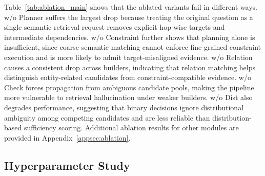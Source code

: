 \documentclass{article}
\theoremstyle{plain}
\theoremstyle{definition}
\theoremstyle{remark}
\begin{document}
Table~\ref{tab:ablation_main} shows that the ablated variants fail in different ways. 
w/o Planner suffers the largest drop because treating the original question as a single semantic retrieval request removes explicit hop-wise targets and intermediate dependencies. 
w/o Constraint further shows that planning alone is insufficient, since coarse semantic matching cannot enforce fine-grained constraint execution and is more likely to admit target-misaligned evidence. 
w/o Relation causes a consistent drop across builders, indicating that relation matching helps distinguish entity-related candidates from constraint-compatible evidence. 
w/o Check forces propagation from ambiguous candidate pools, making the pipeline more vulnerable to retrieval hallucination under weaker builders. 
w/o Dist also degrades performance, suggesting that binary decisions ignore distributional ambiguity among competing candidates and are less reliable than distribution-based sufficiency scoring. Additional ablation results for other modules are provided in Appendix~\ref{appsec:ablation}.

\subsection{Hyperparameter Study}
\label{appsec:rq7_hparam}


\end{document}
